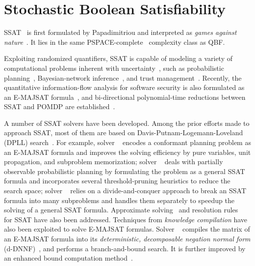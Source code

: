 \section{Stochastic Boolean Satisfiability}
\label{sect:related-work-ssat}

SSAT~\cite{Littman2001,SATHandbook-SSAT} is first formulated by Papadimitriou
and interpreted as \textit{games against nature}~\cite{Papadimitriou1985}.
It lies in the same PSPACE-complete~\cite{Stockmeyer1973} complexity class as QBF.

Exploiting randomized quantifiers,
SSAT is capable of modeling a variety of computational problems inherent with uncertainty~\cite{Hnich2011},
such as probabilistic planning~\cite{Kushmerick1995,Littman1998},
Bayesian-network inference~\cite{Cooper1990,Jensen1996,Dechter1998,Bacchus2003},
and trust management~\cite{SATHandbook-SSAT}.
Recently, the quantitative information-flow analysis for software security is also formulated
as an E-MAJSAT formula~\cite{Fremont2017},
and bi-directional polynomial-time reductions between SSAT and POMDP are established~\cite{Salmon2020}.

A number of SSAT solvers have been developed.
Among the prior efforts made to approach SSAT,
most of them are based on Davis-Putnam-Logemann-Loveland (DPLL) search~\cite{Davis1962}.
For example,
solver \maxplan~\cite{Majercik1998} encodes a conformant planning problem as an E-MAJSAT formula
and improves the solving efficiency by pure variables, unit propagation, and subproblem memorization;
solver \zander~\cite{Majercik2003} deals with partially observable probabilistic planning by formulating the problem as a general SSAT formula and incorporates several threshold-pruning heuristics to reduce the search space;
solver \dcssat~\cite{Majercik2005} relies on a divide-and-conquer approach to break an SSAT formula into many subproblems and handles them separately to speedup the solving of a general SSAT formula.
Approximate solving~\cite{Majercik2007} and resolution rules~\cite{Teige2010} for SSAT have also been addressed.
Techniques from \textit{knowledge compilation} have also been exploited to solve E-MAJSAT formulas.
Solver \complan~\cite{Huang2006} compiles the matrix of an E-MAJSAT formula into its
\textit{deterministic, decomposable negation normal form} (d-DNNF)~\cite{Darwiche2001,Darwiche2002dDNNF},
and performs a branch-and-bound search.
It is further improved by an enhanced bound computation method~\cite{Pipatsrisawat2009}.